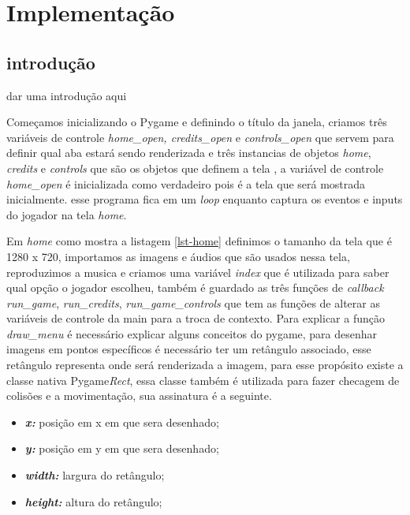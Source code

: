 \chapter{Implementação}
\label{sec-implementacao}
\section{introdução}
dar uma introdução aqui

Começamos inicializando o Pygame e definindo o título da janela, criamos três variáveis de controle \textit{home\_open, credits\_open} e \textit{controls\_open} que servem para definir qual aba estará sendo renderizada e três instancias de objetos \textit{home}, \textit{credits} e \textit{controls}  que são os objetos que definem a tela , a variável de controle \textit{home\_open} é inicializada como verdadeiro pois é a tela que será mostrada inicialmente. esse programa fica em um \textit{loop} enquanto captura os eventos e inputs do jogador na tela \textit{home}.


\newpage


Em \textit{home} como mostra a listagem \ref{lst-home} definimos o tamanho da tela que é 1280 x 720, importamos as imagens e áudios que são usados nessa tela, reproduzimos a musica e criamos uma variável \textit{index} que é utilizada para saber qual opção o jogador escolheu, também é guardado as três funções de \textit{callback} \textit{run\_game}, \textit{run\_credits}, \textit{run\_game\_controls} que tem as funções de alterar as variáveis de controle da main para a troca de contexto. Para explicar a função \textit{draw\_menu} é necessário explicar alguns conceitos do pygame, para desenhar imagens em pontos específicos é necessário ter um retângulo associado, esse retângulo representa onde será renderizada a imagem, para esse propósito existe a classe nativa Pygame\textit{Rect}, essa classe também é utilizada para fazer checagem de colisões e a movimentação, sua assinatura é a seguinte.
\begin{itemize}
    \item \textit{\textbf{x:}} posição em x em que sera desenhado;
    \item \textit{\textbf{y:}} posição em y em que sera desenhado;
    \item \textit{\textbf{width:}} largura do retângulo;
    \item \textit{\textbf{height:}} altura do retângulo;
\end{itemize}


